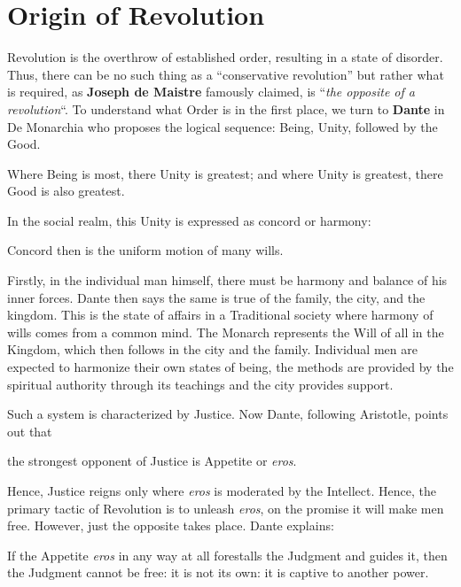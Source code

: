 \section{Origin of Revolution}

Revolution is the overthrow of established order, resulting in a state of disorder. Thus, there can be no such thing as a ``conservative revolution'' but rather what is required, as \textbf{Joseph de Maistre} famously claimed, is ``\emph{the opposite of a revolution}``. To understand what Order is in the first place, we turn to \textbf{Dante} in De Monarchia who proposes the logical sequence: Being, Unity, followed by the Good.

\begin{quotex}
Where Being is most, there Unity is greatest; and where Unity is greatest, there Good is also greatest.
\end{quotex}

In the social realm, this Unity is expressed as concord or harmony:

\begin{quotex}
Concord then is the uniform motion of many wills.
\end{quotex}


Firstly, in the individual man himself, there must be harmony and balance of his inner forces. Dante then says the same is true of the family, the city, and the kingdom. This is the state of affairs in a Traditional society where harmony of wills comes from a common mind. The Monarch represents the Will of all in the Kingdom, which then follows in the city and the family. Individual men are expected to harmonize their own states of being, the methods are provided by the spiritual authority through its teachings and the city provides support.

Such a system is characterized by Justice. Now Dante, following Aristotle, points out that

\begin{quotex}
the strongest opponent of Justice is Appetite or \emph{eros}.
\end{quotex}


Hence, Justice reigns only where \emph{eros} is moderated by the Intellect. Hence, the primary tactic of Revolution is to unleash \emph{eros}, on the promise it will make men free. However, just the opposite takes place. Dante explains:

\begin{quotex}
If the Appetite \emph{eros} in any way at all forestalls the Judgment and guides it, then the Judgment cannot be free: it is not its own: it is captive to another power.
\end{quotex}


